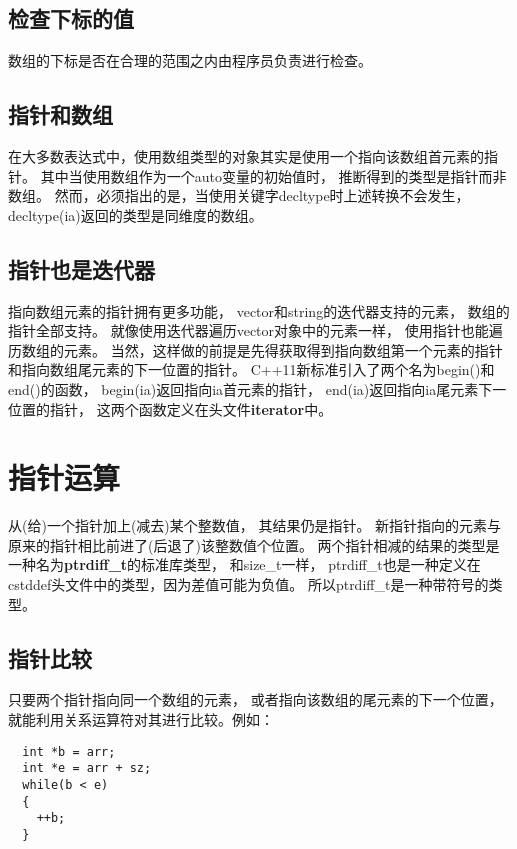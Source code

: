 \subsection{检查下标的值}
数组的下标是否在合理的范围之内由程序员负责进行检查。%
\subsection{指针和数组}
在大多数表达式中，使用数组类型的对象其实是使用一个指向该数组首元素的指针。
其中当使用数组作为一个auto变量的初始值时，%
推断得到的类型是指针而非数组。%
然而，必须指出的是，当使用关键字decltype时上述转换不会发生，%
decltype(ia)返回的类型是同维度的数组。
\subsection{指针也是迭代器}
指向数组元素的指针拥有更多功能，%
vector和string的迭代器支持的元素，%
数组的指针全部支持。%
就像使用迭代器遍历vector对象中的元素一样，%
使用指针也能遍历数组的元素。%
当然，这样做的前提是先得获取得到指向数组第一个元素的指针和指向数组尾元素的下一位置的指针。
C++11新标准引入了两个名为begin()和end()的函数，%
begin(ia)返回指向ia首元素的指针，%
end(ia)返回指向ia尾元素下一位置的指针，%
这两个函数定义在头文件{\bfseries{iterator}}中。
\section{指针运算}
从(给)一个指针加上(减去)某个整数值，%
其结果仍是指针。%
新指针指向的元素与原来的指针相比前进了(后退了)该整数值个位置。%
两个指针相减的结果的类型是一种名为{\bfseries{ptrdiff\_t}}的标准库类型，%
和size\_t一样，%
ptrdiff\_t也是一种定义在cstddef头文件中的类型，因为差值可能为负值。%
所以ptrdiff\_t是一种带符号的类型。
\subsection{指针比较}
只要两个指针指向同一个数组的元素，%
或者指向该数组的尾元素的下一个位置，%
就能利用关系运算符对其进行比较。例如：%
\begin{lstlisting}
  int *b = arr;
  int *e = arr + sz;
  while(b < e)
  {
    ++b;
  }
\end{lstlisting}

